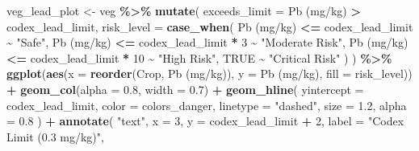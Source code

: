 \documentclass[
]{article}
\newenvironment{Shaded}{\begin{snugshade}}{\end{snugshade}}
\newcommand{\AttributeTok}[1]{\textcolor[rgb]{0.13,0.29,0.53}{#1}}
\newcommand{\ConstantTok}[1]{\textcolor[rgb]{0.56,0.35,0.01}{#1}}
\newcommand{\DecValTok}[1]{\textcolor[rgb]{0.00,0.00,0.81}{#1}}
\newcommand{\FloatTok}[1]{\textcolor[rgb]{0.00,0.00,0.81}{#1}}
\newcommand{\FunctionTok}[1]{\textcolor[rgb]{0.13,0.29,0.53}{\textbf{#1}}}
\newcommand{\NormalTok}[1]{#1}
\newcommand{\OtherTok}[1]{\textcolor[rgb]{0.56,0.35,0.01}{#1}}
\newcommand{\SpecialCharTok}[1]{\textcolor[rgb]{0.81,0.36,0.00}{\textbf{#1}}}
\newcommand{\StringTok}[1]{\textcolor[rgb]{0.31,0.60,0.02}{#1}}
\begin{document}
\begin{Shaded}
\begin{Highlighting}[]
\NormalTok{veg\_lead\_plot }\OtherTok{\textless{}{-}}\NormalTok{ veg }\SpecialCharTok{\%\textgreater{}\%}
  \FunctionTok{mutate}\NormalTok{(}
    \AttributeTok{exceeds\_limit =} \StringTok{\textasciigrave{}}\AttributeTok{Pb (mg/kg)}\StringTok{\textasciigrave{}} \SpecialCharTok{\textgreater{}}\NormalTok{ codex\_lead\_limit,}
    \AttributeTok{risk\_level =} \FunctionTok{case\_when}\NormalTok{(}
      \StringTok{\textasciigrave{}}\AttributeTok{Pb (mg/kg)}\StringTok{\textasciigrave{}} \SpecialCharTok{\textless{}=}\NormalTok{ codex\_lead\_limit }\SpecialCharTok{\textasciitilde{}} \StringTok{"Safe"}\NormalTok{,}
      \StringTok{\textasciigrave{}}\AttributeTok{Pb (mg/kg)}\StringTok{\textasciigrave{}} \SpecialCharTok{\textless{}=}\NormalTok{ codex\_lead\_limit }\SpecialCharTok{*} \DecValTok{3} \SpecialCharTok{\textasciitilde{}} \StringTok{"Moderate Risk"}\NormalTok{,}
      \StringTok{\textasciigrave{}}\AttributeTok{Pb (mg/kg)}\StringTok{\textasciigrave{}} \SpecialCharTok{\textless{}=}\NormalTok{ codex\_lead\_limit }\SpecialCharTok{*} \DecValTok{10} \SpecialCharTok{\textasciitilde{}} \StringTok{"High Risk"}\NormalTok{,}
      \ConstantTok{TRUE} \SpecialCharTok{\textasciitilde{}} \StringTok{"Critical Risk"}
\NormalTok{    )}
\NormalTok{  ) }\SpecialCharTok{\%\textgreater{}\%}
  \FunctionTok{ggplot}\NormalTok{(}\FunctionTok{aes}\NormalTok{(}\AttributeTok{x =} \FunctionTok{reorder}\NormalTok{(Crop, }\StringTok{\textasciigrave{}}\AttributeTok{Pb (mg/kg)}\StringTok{\textasciigrave{}}\NormalTok{), }\AttributeTok{y =} \StringTok{\textasciigrave{}}\AttributeTok{Pb (mg/kg)}\StringTok{\textasciigrave{}}\NormalTok{, }\AttributeTok{fill =}\NormalTok{ risk\_level)) }\SpecialCharTok{+}
  \FunctionTok{geom\_col}\NormalTok{(}\AttributeTok{alpha =} \FloatTok{0.8}\NormalTok{, }\AttributeTok{width =} \FloatTok{0.7}\NormalTok{) }\SpecialCharTok{+}
  \FunctionTok{geom\_hline}\NormalTok{(}
    \AttributeTok{yintercept =}\NormalTok{ codex\_lead\_limit, }
    \AttributeTok{color =}\NormalTok{ colors\_danger, }
    \AttributeTok{linetype =} \StringTok{"dashed"}\NormalTok{, }
    \AttributeTok{size =} \FloatTok{1.2}\NormalTok{,}
    \AttributeTok{alpha =} \FloatTok{0.8}
\NormalTok{  ) }\SpecialCharTok{+}
  \FunctionTok{annotate}\NormalTok{(}
    \StringTok{"text"}\NormalTok{,}
    \AttributeTok{x =} \DecValTok{3}\NormalTok{, }\AttributeTok{y =}\NormalTok{ codex\_lead\_limit }\SpecialCharTok{+} \DecValTok{2}\NormalTok{,}
    \AttributeTok{label =} \StringTok{"Codex Limit (0.3 mg/kg)"}\NormalTok{,}

\end{Highlighting}
\end{Shaded}
\end{document}
